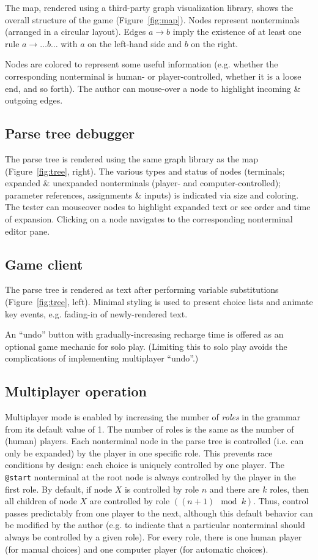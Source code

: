 \documentclass{acm_proc_article-sp}
\begin{document}
The map, rendered using a third-party graph visualization library,
shows the overall structure of the game (Figure~\ref{fig:map}).
Nodes represent nonterminals (arranged in a circular layout).
Edges $a \to b$ imply the existence of at least one rule $a \to \ldots b \ldots$
with $a$ on the left-hand side and $b$ on the right.

Nodes are colored to represent some useful information
(e.g. whether the corresponding nonterminal is human- or player-controlled,
whether it is a loose end, and so forth).
The author can mouse-over a node to highlight incoming \& outgoing edges.

\subsection{Parse tree debugger}

The parse tree is rendered using the same graph library as the map (Figure~\ref{fig:tree}, right).
The various types and status of nodes (terminals; expanded \& unexpanded nonterminals (player- and computer-controlled); parameter references, assignments \& inputs) is indicated via size and coloring.
The tester can mouseover nodes to highlight expanded text or see order and time of expansion.
Clicking on a node navigates to the corresponding nonterminal editor pane.

\subsection{Game client}

The parse tree is rendered as text after performing variable substitutions (Figure~\ref{fig:tree}, left).
Minimal styling is used to present choice lists and animate key events,
e.g. fading-in of newly-rendered text.

An ``undo'' button with gradually-increasing recharge time is offered as an optional game mechanic for solo play.
(Limiting this to solo play avoids the complications of implementing multiplayer ``undo''.)

\subsection{Multiplayer operation}

Multiplayer mode is enabled by increasing the number of {\em roles} in the grammar from its default value of 1.
The number of roles is the same as the number of (human) players.
Each nonterminal node in the parse tree is controlled (i.e. can only be expanded) by the player in one specific role.
This prevents race conditions by design: each choice is uniquely controlled by one player.
The {\tt @start} nonterminal at the root node is always controlled by the player in the first role.
By default, if node $X$ is controlled by role $n$ and there are $k$ roles,
then all children of node $X$ are controlled by role $((n+1)\mod k)$.
Thus, control passes predictably from one player to the next,
although this default behavior can be modified by the author (e.g. to indicate that a particular nonterminal
should always be controlled by a given role).
For every role, there is one human player (for manual choices)
and one computer player (for automatic choices).
\end{document}
